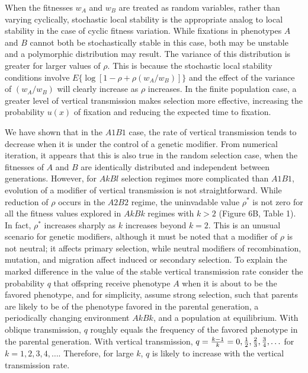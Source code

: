 \documentclass[9pt,twocolumn,twoside,lineno]{pnas-new}
\begin{document}
 When the fitnesses $w_A$ and $w_B$ are treated as random variables, rather than varying cyclically, stochastic local stability is the appropriate analog to local stability in the case of cyclic fitness variation. While fixations in phenotypes $A$ and $B$ cannot both be stochastically stable in this case, both may be unstable and a polymorphic distribution may result. The variance of this distribution is greater for larger values of $\rho$. This is because the  stochastic local stability conditions involve $E\bigl\{\log[1-\rho+\rho(w_A/w_B)]\bigr\}$ and the effect of the variance of $(w_A/w_B)$ will clearly increase as $\rho$ increases. In the finite population case, a greater level of vertical transmission makes selection more effective, increasing the probability $u(x)$ of fixation and reducing the expected time to fixation.
 
 We have shown that in the $A1B1$ case, the rate of vertical transmission tends to decrease when it is under the control of a genetic modifier. From numerical iteration, it appears that this is also true in the random selection case, when the fitnesses of $A$ and $B$ are identically distributed and independent between generations. However, for $AkBl$ selection regimes more complicated than $A1B1$, evolution of a modifier of vertical transmission is not straightforward. While reduction of $\rho$ occurs in the $A2B2$ regime, the uninvadable value $\rho^*$ is not zero for all the fitness values explored in $AkBk$ regimes with $k>2$ (Figure 6B, Table 1). In fact, $\rho^*$ increases sharply as $k$ increases beyond $k=2$. This is an unusual scenario for genetic modifiers, although it must be noted that a modifier of $\rho$ is not neutral; it affects primary selection, while neutral  modifiers of recombination, mutation, and migration affect induced or secondary selection.
To explain the marked difference in the value of the stable vertical transmission rate consider the probability $q$ that offspring receive phenotype $A$ when it is about to be the favored phenotype, and for simplicity, assume strong selection, such that parents are likely to be of the phenotype favored in the parental generation, a periodically changing environment $AkBk$, and a population at equilibrium.
With oblique transmission, $q$ roughly equals the frequency of the favored phenotype in the parental generation.
With vertical transmission, $q=\frac{k-1}{k} = 0, {1 \over 2}, {2 \over 3}, {3 \over 4}, \ldots$ for $k=1, 2, 3, 4, \ldots$.
Therefore, for large $k$, $q$ is likely to increase with the vertical transmission rate.
 
\end{document}
